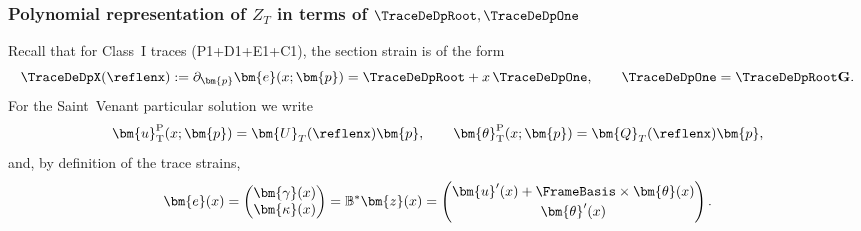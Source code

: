 
\subsubsection{Polynomial representation of $Z_T$ in terms of $\TraceDeDpRoot,\TraceDeDpOne$}

Recall that for Class~I traces (P1+D1+E1+C1), the section strain is of the form
\[
  \TraceDeDpX(\reflenx) := \partial_{\bm{p}} \bm{e}(x;\bm{p})
  = \TraceDeDpRoot + x\,\TraceDeDpOne,
  \qquad
  \TraceDeDpOne = \TraceDeDpRoot\mathbf{G}.
\]
For the Saint~Venant particular solution we write
\[
  \bm{u}_{\mathrm{T}}^{\mathrm{P}}(x;\bm{p}) = \bm{U}_T(\reflenx)\bm{p},
  \qquad
  \bm{\theta}_{\mathrm{T}}^{\mathrm{P}}(x;\bm{p}) = \bm{Q}_T(\reflenx)\bm{p},
\]
and, by definition of the trace strains,
\[
  \bm{e}(x) =
  \begin{pmatrix}
    \bm{\gamma}(x) \\ \bm{\kappa}(x)
  \end{pmatrix}
  =
  \mathbb{B}^*\bm{z}(x)
  =
  \begin{pmatrix}
    \bm{u}'(x)+\FrameBasis\times\bm{\theta}(x)\\[2pt]
    \bm{\theta}'(x)
  \end{pmatrix}.
\]
